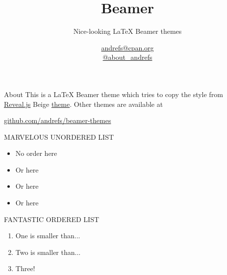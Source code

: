 \documentclass[serif,14pt,color=usenames,dvipsnames]{beamer}
\title{Beamer}
\subtitle{Nice-looking LaTeX Beamer themes}
\author{\href{mailto:andrefs@cpan.org}{andrefs@cpan.org}\\\href{http://twitter.com/about\_andrefs}{@about\_andrefs}}
\institute{Institute, Location}
\begin{document}
\begin{frame}
\maketitle
\end{frame}

\begin{frame}{About}
This is a LaTeX Beamer theme which tries to copy the style from \href{http://lab.hakim.se/reveal-js}{Reveal.js} Beige \href{http://lab.hakim.se/reveal-js/?theme=beige}{theme}. Other themes are available at
\begin{center}
\url{github.com/andrefs/beamer-themes}
\end{center}
\end{frame}

\begin{frame}{MARVELOUS UNORDERED LIST}
\begin{itemize}
\item No order here
\item Or here
\item Or here
\item Or here
\end{itemize}
\end{frame}

\begin{frame}{FANTASTIC ORDERED LIST}
\begin{enumerate}
	\item One is smaller than...
	\item Two is smaller than...
	\item Three!
\end{enumerate}
\end{frame}
\end{document}

